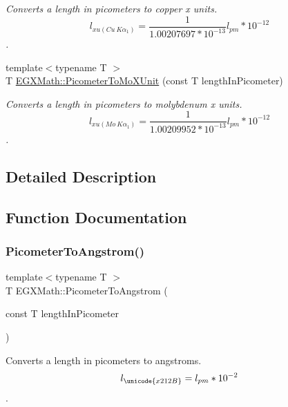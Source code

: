 \begin{DoxyCompactItemize}
\begin{DoxyCompactList}\small\item\em Converts a length in picometers to copper x units. \[ l_{xu(Cu\ K\alpha_1)}= \frac{1}{1.00207697*10^{-13}} l_{pm} * 10^{-12}\]. \end{DoxyCompactList}\item 
{\footnotesize template$<$typename T $>$ }\\T \mbox{\hyperlink{group___e_g_x_math-_conversions-_length_conversions-_s_i-_picometer-_non-_s_i_ga51b96b4bb30b7e9c971db81ff89a82f8}{E\+G\+X\+Math\+::\+Picometer\+To\+Mo\+X\+Unit}} (const T length\+In\+Picometer)
\begin{DoxyCompactList}\small\item\em Converts a length in picometers to molybdenum x units. \[ l_{xu(Mo\ K\alpha_1)}=\frac{1}{1.00209952*10^{-13}} l_{pm} * 10^{-12}\]. \end{DoxyCompactList}\end{DoxyCompactItemize}


\subsection{Detailed Description}


\subsection{Function Documentation}
\mbox{\label{group___e_g_x_math-_conversions-_length_conversions-_s_i-_picometer-_non-_s_i_ga0b1b4a3ec4ea0110477f4547025d2719}} 
\subsubsection{\texorpdfstring{Picometer\+To\+Angstrom()}{PicometerToAngstrom()}}
{\footnotesize\ttfamily template$<$typename T $>$ \\
T E\+G\+X\+Math\+::\+Picometer\+To\+Angstrom (\begin{DoxyParamCaption}\item[{const T}]{length\+In\+Picometer }\end{DoxyParamCaption})}



Converts a length in picometers to angstroms. \[ l_{\unicode{x212B}}=l_{pm} * 10^{-2} \]. 

